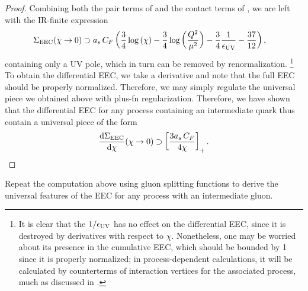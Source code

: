 \begin{proof}
Combining both the pair terms of  and the contact terms of , we are left with the IR-finite expression
\begin{align}
    \Sigma_\text{EEC}(\chi \to 0)
    &\supset
    a_s \, C_F
    \left(
        \frac{3}{4}\log\left(\chi\right)
        -
        \frac{3}{4}\log\left(\frac{Q^2}{\mu^2}\right)
        -
        \frac{3}{4}\frac{1}{\epsilon_\text{UV}}
        -
        \frac{37}{12}
    \right)
    ,
\end{align}
containing only a UV pole, which in turn can be removed by renormalization.%
\footnote{
    It is clear that the \(1/\epsilon_\text{UV}\) has no effect on the differential EEC, since it is destroyed by derivatives with respect to \(\chi\).
    Nonetheless, one may be worried about its presence in the cumulative EEC, which should be bounded by 1 since it is properly normalized;
    in process-dependent calculations, it will be calculated by counterterms of interaction vertices for the associated process, much as discussed in \Sec{}.
}
%
To obtain the differential EEC, we take a derivative and note that the full EEC should be properly normalized.
%
Therefore, we may simply regulate the universal piece we obtained above with \gls{plus-fn} regularization.
%
Therefore, we have shown that the differential EEC for any process containing an intermediate quark  thus contain a universal piece of the form
\begin{align}
    \label{eq:universal_differential_eec}
    \frac{\dd \Sigma_\text{EEC}}{\dd \chi}
    (\chi \to 0)
    \supset
    \le[
    \frac{3\ascf}{4\chi}
    \ri]_+
    .
\end{align}


\end{proof}


\begin{exercise}
    Repeat the computation above using gluon splitting functions to derive the universal features of the EEC for any process with an intermediate gluon.
\end{exercise}




